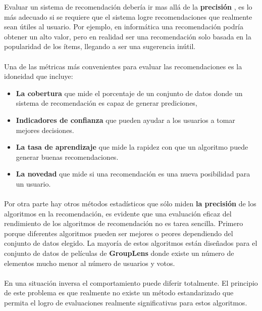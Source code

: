 \documentclass[12pt,letterpaper,oneside] {memoir}
\begin{document}
Evaluar un sistema de recomendación debería ir mas allá de la \textbf{precisión} \citep{Adomavicius2005, Herlocker1991}, es lo más adecuado si se requiere que el sistema logre recomendaciones que realmente sean útiles al usuario. Por ejemplo, en informática una recomendación podría obtener un alto valor, pero en realidad ser una recomendación solo basada en la popularidad de los ítems, llegando a ser una sugerencia inútil.
\paragraph{}
Una de las métricas más convenientes para evaluar las recomendaciones es la idoneidad \citep{Herlocker2004} que incluye:
\begin{itemize}
\item \textbf{La cobertura} que mide el porcentaje de un conjunto de datos donde un sistema de recomendación es capaz de generar prediciones, 
\item \textbf{Indicadores de confianza} que pueden ayudar a los usuarios a tomar mejores decisiones.
\item \textbf{La tasa de aprendizaje} que mide la rapidez con que un algoritmo puede generar buenas recomendaciones.
\item \textbf{La novedad} que mide si una recomendación es una nueva posibilidad para un usuario.
 \end{itemize}
 
\paragraph{}
Por otra parte hay otros métodos estadísticos que sólo miden \textbf{la precisión} de los algoritmos en la recomendación, es evidente que una evaluación eficaz del rendimiento de los algoritmos de recomendación no es tarea sencilla. Primero porque diferentes algoritmos pueden ser mejores o peores dependiendo del conjunto de datos elegido. La mayoría de estos algoritmos están diseñados para el conjunto de datos de películas de \textbf{GroupLens} donde existe un número de elementos mucho menor al número de usuarios y votos. 
\paragraph{}
En una situación inversa el comportamiento puede diferir totalmente. El principio de este problema es que realmente no existe un método estandarizado que permita el logro de evaluaciones realmente significativas para estos algoritmos.
\end{document}
